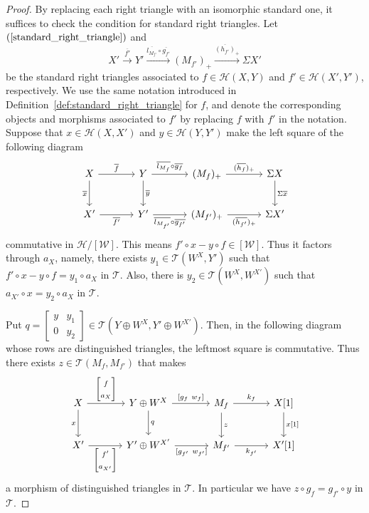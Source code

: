 \documentclass[a4paper,reqno,10pt]{amsart}
\DeclareRobustCommand{\darkblueedit}[1]{#1}
\theoremstyle{definition}
\theoremstyle{definition}
\theoremstyle{definition}
\theoremstyle{definition}
\theoremstyle{plain}
\newcommand{\CH}{\mathcal{H}}
\newcommand{\CT}{\mathcal{T}}
\newcommand{\CW}{\mathcal{W}}
\begin{document}
\begin{proof}
By replacing each right triangle with an isomorphic standard one, it suffices to check the condition for standard right triangles. 
Let $(\ref{standard_right_triangle})$ and
\[
X'\xrightarrow{\overline{f'}}Y'\xrightarrow{\overline{l_{M_{f'}}}\circ \overline{g_{f'}}}(M_{f'})_+\xrightarrow{\overline{(h_{f'})}_+}\Sigma X'
\]
be the standard right triangles associated to $f\in\CH(X,Y)$ and $f'\in\CH(X',Y')$, respectively. We use the same notation introduced in Definition~\ref{def:standard_right_triangle} for $f$, and denote the corresponding objects and morphisms associated to $f'$ by replacing $f$ with $f'$ in the notation. Suppose that $x\in\CH(X,X')$ and $y\in\CH(Y,Y')$ \darkblueedit{make} the left square of the following diagram
\[
\begin{tikzcd}[row sep=0.8cm, column sep=1.2cm]
X\arrow[r, "\overline{f}"]
\arrow[d, swap, "\overline{x}" ]
&Y\arrow[r, "\overline{l_{M_f}}\circ \overline{g_f}"]
\arrow[d, "\overline{y}"]
&(M_f)_+ \arrow[r, "(\overline{h_f})_+"]
&\Sigma X
\arrow[d, "\Sigma\overline{x}"]
\\
X'\arrow[r, swap, "\overline{f'}"]
&Y'\arrow[r, swap, "\overline{l_{M_{f'}}}\circ\overline{g_{f'}}"]
&(M_{f'})_+ \arrow[r, swap, "(\overline{h_{f'}})_+"]
&\Sigma X'
\end{tikzcd}
\]
commutative in $\CH/[\CW]$. This means $f'\circ x-y\circ f\in[\CW]$. Thus it factors through $a_X$, namely, there exists $y_1\in\CT(W^X,Y')$ such that $f'\circ x-y\circ f=y_1\circ a_X$ in $\CT$. Also, there is $y_2\in\CT(W^X,W^{X'})$ such that $a_{X'}\circ x=y_2\circ a_X$ in $\CT$.

Put $q=\begin{bmatrix}y&y_1\\0&y_2\end{bmatrix}\in\CT(Y\oplus W^X,Y'\oplus W^{X'})$.
Then, in the following diagram whose rows are distinguished triangles, the leftmost square is commutative. Thus there exists $z\in\CT(M_f,M_{f'})$ that makes
\begin{equation}\label{morph_of_tri_XYW}
\begin{tikzcd}[row sep=0.8cm, column sep=1.2cm]
X\arrow[r, "\begin{bmatrix}f\\ a_X\end{bmatrix}"]
\arrow[d, swap, "x" ]
&Y\oplus W^X\arrow[r, "{[}g_f\ w_f{]}"]
\arrow[d, "q"]
&M_f \arrow[r, "k_{f}"]
\arrow[d, "z"]
&X[1]
\arrow[d, "x{[}1{]}"]
\\
X'\arrow[r, swap, "\begin{bmatrix}f'\\ a_{X'}\end{bmatrix}"]
&Y'\oplus W^{X'}\arrow[r, swap, "{[}g_{f'}\ w_{f'}{]}"]
&M_{f'} \arrow[r, swap, "k_{f'}"]
&X'[1]
\end{tikzcd}
\end{equation}
a morphism of distinguished triangles in $\CT$.
In particular we have $z\circ g_f=g_{f'}\circ y$ in $\CT$. 


\end{proof}
\end{document}
